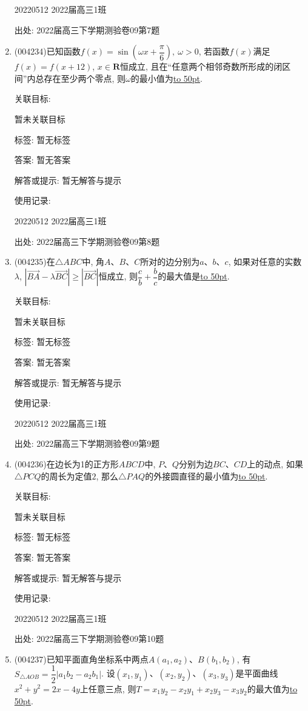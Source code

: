 \documentclass[10pt,a4paper]{article}
\newcommand{\blank}[1]{\underline{\hbox to #1pt{}}}
\begin{document}
\begin{enumerate}[1.]
20220512	2022届高三1班	


出处: 2022届高三下学期测验卷09第7题
\item { (004234)}已知函数$f(x)=\sin (\omega x+\dfrac{\pi }6), \ \omega >0$, 若函数$f(x)$满足$f(x)=f(x+12)$, $x\in \mathbf{R}$恒成立, 且在``任意两个相邻奇数所形成的闭区间''内总存在至少两个零点, 则$\omega$的最小值为\blank{50}.


关联目标:

暂未关联目标



标签: 暂无标签

答案: 暂无答案

解答或提示: 暂无解答与提示

使用记录:

20220512	2022届高三1班	


出处: 2022届高三下学期测验卷09第8题
\item { (004235)}在$\triangle ABC$中, 角$A$、$B$、$C$所对的边分别为$a$、$b$、$c$, 如果对任意的实数$\lambda$, $|\overrightarrow{BA}-\lambda \overrightarrow{BC}|\ge |\overrightarrow{BC}|$恒成立, 则$\dfrac cb+\dfrac bc$的最大值是\blank{50}.


关联目标:

暂未关联目标



标签: 暂无标签

答案: 暂无答案

解答或提示: 暂无解答与提示

使用记录:

20220512	2022届高三1班	


出处: 2022届高三下学期测验卷09第9题
\item { (004236)}在边长为1的正方形$ABCD$中, $P$、$Q$分别为边$BC$、$CD$上的动点, 如果$\triangle PCQ$的周长为定值$2$, 那么$\triangle PAQ$的外接圆直径的最小值为\blank{50}.


关联目标:

暂未关联目标



标签: 暂无标签

答案: 暂无答案

解答或提示: 暂无解答与提示

使用记录:

20220512	2022届高三1班	


出处: 2022届高三下学期测验卷09第10题
\item { (004237)}已知平面直角坐标系中两点$A(a_1,a_2)$、$B(b_1,b_2)$, 有$S_{\triangle AOB}=\dfrac 12|a_1b_2-a_2b_1|$. 设$(x_1,y_1)$、$(x_2,y_2)$、$(x_3,y_3)$是平面曲线$x^2+y^2=2x-4y$上任意三点, 则$T=x_1y_2-x_2y_1+x_2y_3-x_3y_2$的最大值为\blank{50}.



\end{enumerate}
\end{document}
